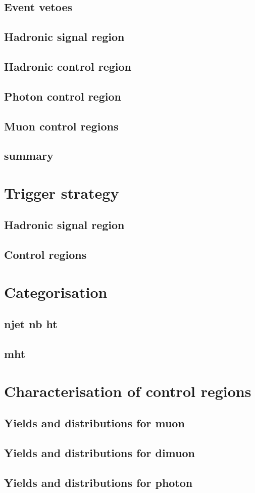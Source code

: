 \subsection{Event vetoes}

\subsection{Hadronic signal region}
\subsection{Hadronic control region}
\subsection{Photon control region}
\subsection{Muon control regions}
\subsection{summary}


\section{Trigger strategy}
\subsection{Hadronic signal region}
\subsection{Control regions}

\section{Categorisation}
\subsection{njet nb ht}
\subsection{mht}

\section{Characterisation of control regions}
\subsection{Yields and distributions for muon}
\subsection{Yields and distributions for dimuon}
\subsection{Yields and distributions for photon}
